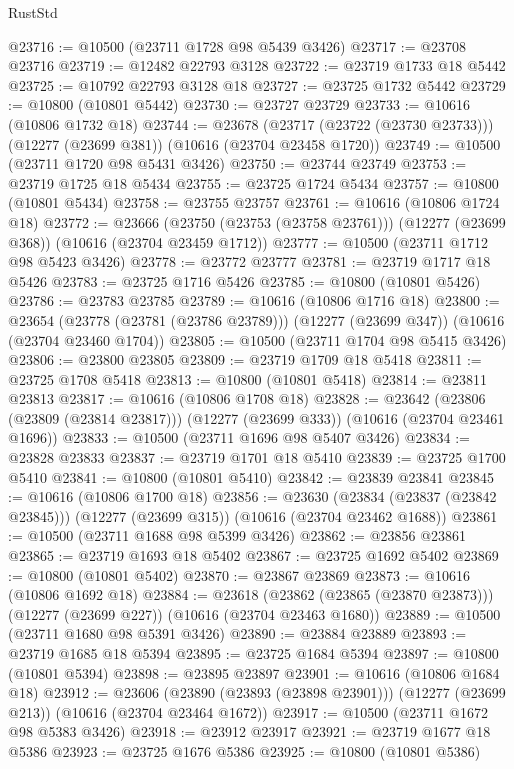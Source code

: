 \begin{lexlean}{RustStd}
\begin{coremodule}
@23716 := @10500 (@23711 @1728 @98 @5439 @3426)
@23717 := @23708 @23716
@23719 := @12482 @22793 @3128
@23722 := @23719 @1733 @18 @5442
@23725 := @10792 @22793 @3128 @18
@23727 := @23725 @1732 @5442
@23729 := @10800 (@10801 @5442)
@23730 := @23727 @23729
@23733 := @10616 (@10806 @1732 @18)
@23744 := @23678
    (@23717 (@23722 (@23730 @23733)))
    (@12277 (@23699 @381))
    (@10616 (@23704 @23458 @1720))
@23749 := @10500 (@23711 @1720 @98 @5431 @3426)
@23750 := @23744 @23749
@23753 := @23719 @1725 @18 @5434
@23755 := @23725 @1724 @5434
@23757 := @10800 (@10801 @5434)
@23758 := @23755 @23757
@23761 := @10616 (@10806 @1724 @18)
@23772 := @23666
    (@23750 (@23753 (@23758 @23761)))
    (@12277 (@23699 @368))
    (@10616 (@23704 @23459 @1712))
@23777 := @10500 (@23711 @1712 @98 @5423 @3426)
@23778 := @23772 @23777
@23781 := @23719 @1717 @18 @5426
@23783 := @23725 @1716 @5426
@23785 := @10800 (@10801 @5426)
@23786 := @23783 @23785
@23789 := @10616 (@10806 @1716 @18)
@23800 := @23654
    (@23778 (@23781 (@23786 @23789)))
    (@12277 (@23699 @347))
    (@10616 (@23704 @23460 @1704))
@23805 := @10500 (@23711 @1704 @98 @5415 @3426)
@23806 := @23800 @23805
@23809 := @23719 @1709 @18 @5418
@23811 := @23725 @1708 @5418
@23813 := @10800 (@10801 @5418)
@23814 := @23811 @23813
@23817 := @10616 (@10806 @1708 @18)
@23828 := @23642
    (@23806 (@23809 (@23814 @23817)))
    (@12277 (@23699 @333))
    (@10616 (@23704 @23461 @1696))
@23833 := @10500 (@23711 @1696 @98 @5407 @3426)
@23834 := @23828 @23833
@23837 := @23719 @1701 @18 @5410
@23839 := @23725 @1700 @5410
@23841 := @10800 (@10801 @5410)
@23842 := @23839 @23841
@23845 := @10616 (@10806 @1700 @18)
@23856 := @23630
    (@23834 (@23837 (@23842 @23845)))
    (@12277 (@23699 @315))
    (@10616 (@23704 @23462 @1688))
@23861 := @10500 (@23711 @1688 @98 @5399 @3426)
@23862 := @23856 @23861
@23865 := @23719 @1693 @18 @5402
@23867 := @23725 @1692 @5402
@23869 := @10800 (@10801 @5402)
@23870 := @23867 @23869
@23873 := @10616 (@10806 @1692 @18)
@23884 := @23618
    (@23862 (@23865 (@23870 @23873)))
    (@12277 (@23699 @227))
    (@10616 (@23704 @23463 @1680))
@23889 := @10500 (@23711 @1680 @98 @5391 @3426)
@23890 := @23884 @23889
@23893 := @23719 @1685 @18 @5394
@23895 := @23725 @1684 @5394
@23897 := @10800 (@10801 @5394)
@23898 := @23895 @23897
@23901 := @10616 (@10806 @1684 @18)
@23912 := @23606
    (@23890 (@23893 (@23898 @23901)))
    (@12277 (@23699 @213))
    (@10616 (@23704 @23464 @1672))
@23917 := @10500 (@23711 @1672 @98 @5383 @3426)
@23918 := @23912 @23917
@23921 := @23719 @1677 @18 @5386
@23923 := @23725 @1676 @5386
@23925 := @10800 (@10801 @5386)

\end{coremodule}
\end{lexlean}

